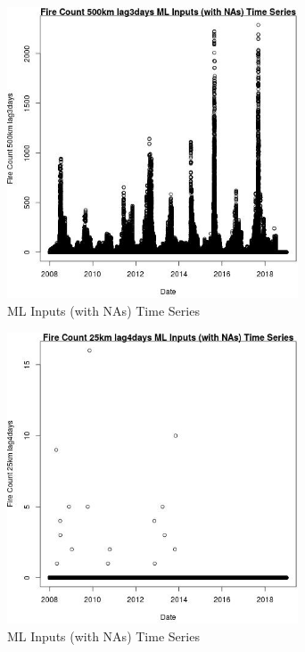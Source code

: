 \begin{figure} 
\centering  
\includegraphics[width=0.77\textwidth]{Code_Outputs/Report_ML_input_PM25_Step4_part_e_de_duplicated_aves_compiled_2019-05-21wNAs_Fire_Count_500km_lag3daysvDate.jpg} 
\caption{\label{fig:Report_ML_input_PM25_Step4_part_e_de_duplicated_aves_compiled_2019-05-21wNAsFire_Count_500km_lag3daysvDate}ML Inputs (with NAs) Time Series} 
\end{figure} 
 

\begin{figure} 
\centering  
\includegraphics[width=0.77\textwidth]{Code_Outputs/Report_ML_input_PM25_Step4_part_e_de_duplicated_aves_compiled_2019-05-21wNAs_Fire_Count_25km_lag4daysvDate.jpg} 
\caption{\label{fig:Report_ML_input_PM25_Step4_part_e_de_duplicated_aves_compiled_2019-05-21wNAsFire_Count_25km_lag4daysvDate}ML Inputs (with NAs) Time Series} 
\end{figure} 
 


